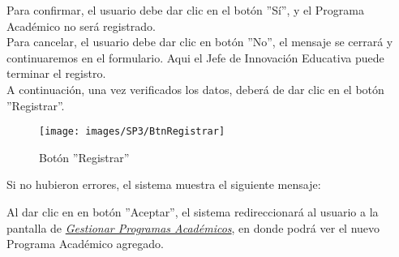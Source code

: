         Para confirmar, el usuario debe dar clic en el botón ''Sí'', y el Programa Académico no será registrado.\\

        Para cancelar, el usuario debe dar clic en botón ''No'', el mensaje se cerrará y continuaremos en el formulario. Aqui el Jefe de Innovación Educativa puede terminar el registro.\\

        A continuación, una vez verificados los datos, deberá de dar clic en el botón ''Registrar''.
        \begin{figure}[!hbtp]
            \centering
            \hypertarget{btnreg}{\texttt{[image: images/SP3/BtnRegistrar]}}
            \caption{Botón ''Registrar''}
            \label{btnreg}
        \end{figure}

        Si no hubieron errores, el sistema muestra el siguiente mensaje:

        Al dar clic en en botón ''Aceptar'', el sistema redireccionará al usuario a la pantalla de \hyperlink{consultarpa}{\textit{Gestionar Programas Académicos}}, en donde podrá ver el nuevo Programa Académico agregado.\\

